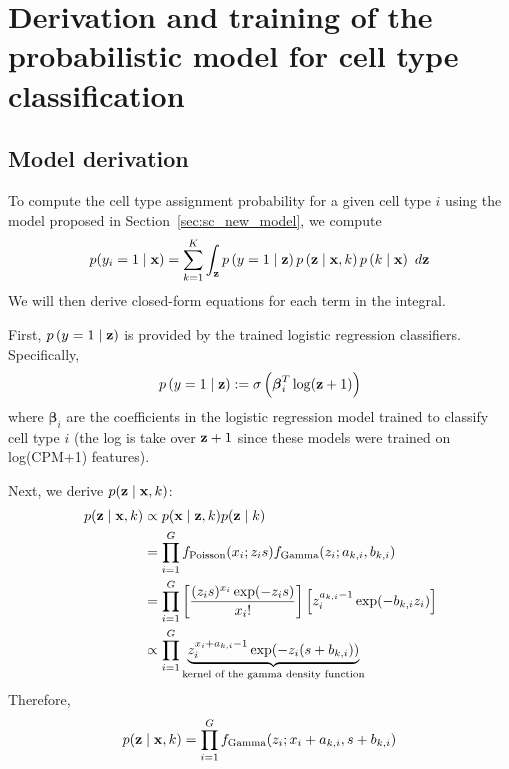 \chapter{Derivation and training of the probabilistic model for cell type classification } \label{app:model_deriv}

\section{Model derivation }

To compute the cell type assignment probability for a given cell type $i$ using the model proposed in Section~\ref{sec:sc_new_model}, we compute
$$p(y_i=1 \mid \bold{x}) = \sum_{k=1}^K \int_{\bold{z}} p\left(y=1 \mid \bold{z}\right) p\left(\bold{z} \mid \bold{x}, k\right) p\left(k \mid \bold{x}\right) \ d\bold{z}$$
We will then derive closed-form equations for each term in the integral.

First, $p\left(y=1 \mid \bold{z}\right)$ is provided by the trained logistic regression classifiers. Specifically,
$$p\left(y=1 \mid \bold{z}\right) := \sigma\left(\boldsymbol{\beta}_i^T\log(\bold{z}+1)\right) $$
where $\boldsymbol{\beta}_i$ are the coefficients in the logistic regression model trained to classify cell type $i$ (the log is take over $\bold{z}+1$ since these models were trained on log(CPM+1) features). 

Next, we derive $p(\bold{z} \mid \bold{x}, k)$:
\begin{align*}
p(\bold{z} \mid \bold{x}, k) &\propto p(\bold{x} \mid \bold{z}, k)p(\bold{z} \mid k)\\
&= \prod_{i=1}^G f_{\text{Poisson}}(x_i ; z_is)f_{\text{Gamma}}(z_i ; a_{k,i}, b_{k,i})\\
&= \prod_{i=1}^G \left[\frac{(z_is)^{x_i} \exp(-z_is)}{x_i!}\right]\left[z_i^{a_{k,i}-1}\exp(-b_{k,i}z_i)\right] \\
&\propto \prod_{i=1}^G \underbrace{z_i^{x_i + a_{k,i} - 1}\exp(-z_i(s + b_{k,i}))}_{\text{kernel of the gamma density function}}
\end{align*}
Therefore,
$$p(\bold{z} \mid \bold{x}, k) = \prod_{i=1}^G f_{\text{Gamma}}(z_i ; x_i + a_{k,i}, s + b_{k,i})$$


